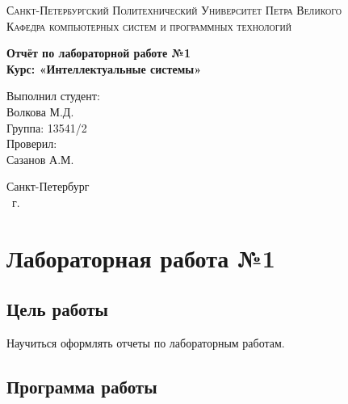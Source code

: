 \documentclass[14pt,a4paper,report]{report}
\begin{document}
\def\contentsname{Содержание}

\begin{titlepage}
	\begin{center}
		\textsc{Санкт-Петербургский Политехнический 
			Университет Петра Великого\\[5mm]
			Кафедра компьютерных систем и программных технологий}
		
		\vfill
		
		\textbf{Отчёт по лабораторной работе №1\\[3mm]
			Курс: «Интеллектуальные системы»\\[41mm]
		}
	\end{center}
	
	\hfill
	\begin{minipage}{.4\textwidth}
		Выполнил студент:\\[2mm] 
		Волкова М.Д.\\
		Группа: 13541/2\\[5mm]
		
		Проверил:\\[2mm] 
		Сазанов А.М.
	\end{minipage}
	\vfill
	\begin{center}
		Санкт-Петербург\\ \the\year\ г.
	\end{center}
\end{titlepage}

\tableofcontents
\clearpage

\chapter{Лабораторная работа №1}

\section{Цель работы}

Научиться оформлять отчеты по лабораторным работам.

\section{Программа работы}
\end{document}
